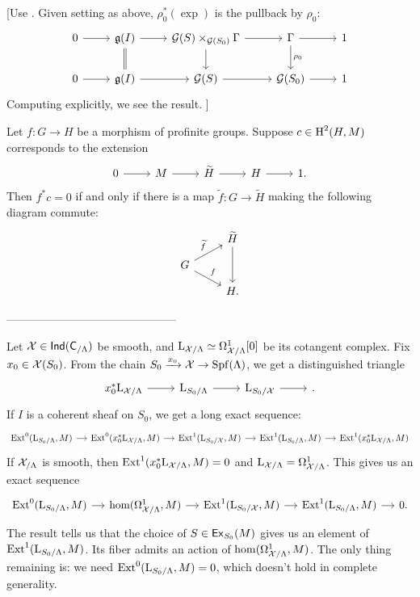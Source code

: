 \documentclass[phd,cornellheadings,draft]{cornell}
\begin{document}
[Use \cite[6.6.4]{weibel-1994}. Given setting as above, $\rho_0^\ast(\exp)$ is 
the pullback by $\rho_0$:
\[
\begin{tikzcd}
	0 \ar[r] 
		& \fg(I) \ar[r] \ar[d, equals]
		& \cG(S)\times_{\cG(S_0)} \Gamma \ar[r] \ar[d] 
		& \Gamma \ar[d, "\rho_0"] \ar[r]
		& 1 \\
	0 \ar[r] 
		& \fg(I) \ar[r]
		& \cG(S) \ar[r] 
		& \cG(S_0) \ar[r] 
		& 1
\end{tikzcd}
\]
Computing explicitly, we see the result. 
]

\begin{proposition}
Let $f\colon G\to H$ be a morphism of profinite groups. Suppose 
$c\in \operatorname{H}^2(H,M)$ corresponds to the extension 
\[
\begin{tikzcd}
	0 \ar[r]
		& M \ar[r]
		& \widetilde H \ar[r]
		& H \ar[r] 
		& 1 .
\end{tikzcd}
\]
Then $f^\ast c=0$ if and only if there is a map 
$\widetilde f\colon G\to \widetilde H$ making the following diagram commute: 
\[
\begin{tikzcd}[row sep=small]
	& \widetilde H \ar[dd] \\
	G \ar[ur, "\widetilde f"] \ar[dr, "f"] \\
	& H .
\end{tikzcd}
\]
\end{proposition}


---------------------------------------------

Let $\mathcal{X}\in \operatorname{\mathsf{Ind}}(\mathsf{C}_{/\Lambda})$ be smooth, and 
$\mathrm{L}_{\mathcal{X}/\Lambda}\simeq \Omega_{\mathcal{X}/\Lambda}^1[0]$ be its cotangent complex. 
Fix $x_0\in \mathcal{X}(S_0)$. From the chain 
$S_0\xrightarrow{x_0} \mathcal{X} \to \operatorname{Spf}(\Lambda)$, we get a distinguished triangle 
\cite[II 2.1.5.6]{illusie-1971}
\[
\begin{tikzcd}
	x_0^\ast \LL_{\cX/\Lambda} \ar[r]
		& \LL_{S_0/\Lambda} \ar[r]
		& \LL_{S_0/\cX} \ar[r] 
		& {} .
\end{tikzcd}
\]
If $I$ is a coherent sheaf on $S_0$, we get a long exact sequence:
\[
\begin{tikzcd}[column sep=small]
	\ext^0(\LL_{S_0/\Lambda},M) \ar[r]
		& \ext^0(x_0^\ast \LL_{\cX/\Lambda},M) \ar[r]
		& \ext^1(\LL_{S_0/\cX},M) \ar[r]
		& \ext^1(\LL_{S_0/\Lambda},M) \ar[r]
		& \ext^1(x_0^\ast \LL_{\cX/\Lambda},M)
\end{tikzcd}
\]
If $\mathcal{X}_{/\Lambda}$ is smooth, then $\operatorname{Ext}^1(x_0^\ast\mathrm{L}_{\mathcal{X}/\Lambda},M)=0$ and 
$\mathrm{L}_{\mathcal{X}/\Lambda} = \Omega_{\mathcal{X}/\Lambda}^1$. This gives us an exact sequence 
\[
\begin{tikzcd}[column sep=small]
	\ext^0(\LL_{S_0/\Lambda},M) \ar[r]
		& \hom(\Omega_{\cX/\Lambda}^1,M) \ar[r]
		& \ext^1(\LL_{S_0/\cX},M) \ar[r]
		& \ext^1(\LL_{S_0/\Lambda},M) \ar[r]
		& 0 .
\end{tikzcd}
\]
The result \cite[III 2.1.7]{illusie-1971} tells us that the choice of 
$S\in \mathsf{Ex}_{S_0}(M)$ gives us an element of $\operatorname{Ext}^1(\mathrm{L}_{S_0/\Lambda},M)$. 
Its fiber admits an action of $\hom(\Omega_{\mathcal{X}/\Lambda}^1,M)$. The only thing 
remaining is: we need $\operatorname{Ext}^0(\mathrm{L}_{S_0/\Lambda},M)=0$, which doesn't hold in 
complete generality. 





\printbibliography
\end{document}
